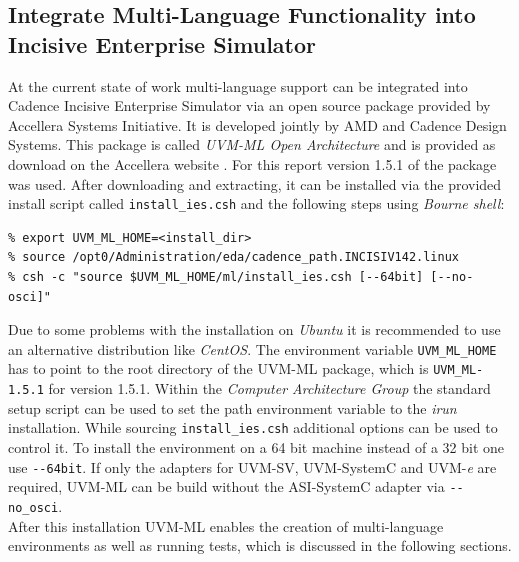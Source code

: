 \subsection{Integrate Multi-Language Functionality into Incisive Enterprise
Simulator}
At the current state of work multi-language support can be integrated into Cadence Incisive Enterprise Simulator via an open source package provided by Accellera Systems Initiative. It is developed jointly by AMD and Cadence Design
Systems. This package is called \emph{UVM-ML Open Architecture} and is provided as download on the Accellera website \cite{uvm_ml}.
For this report version 1.5.1 of the package was used. After downloading and extracting, it can be
installed via the provided install script called \lstinline$install_ies.csh$ and the following steps using \emph{Bourne shell}:

\medskip
{}
\begin{lstlisting}
% export UVM_ML_HOME=<install_dir>
% source /opt0/Administration/eda/cadence_path.INCISIV142.linux
% csh -c "source $UVM_ML_HOME/ml/install_ies.csh [--64bit] [--no-osci]"
\end{lstlisting} 
\medskip 

Due to some problems with the installation on \emph{Ubuntu} it is recommended to use an alternative distribution like
\emph{CentOS}. The environment variable \lstinline$UVM_ML_HOME$ has to point to the root directory of the UVM-ML
package, which is \lstinline$UVM_ML-1.5.1$ for version 1.5.1. Within the \emph{Computer Architecture Group} the standard setup script can be used
to set the path environment variable to the \emph{irun} installation. While sourcing
\lstinline$install_ies.csh$ additional options can be used to control it. To install the environment on a 64 bit machine
instead of a 32 bit one use \lstinline$--64bit$. If only the adapters for UVM-SV, UVM-SystemC and
UVM-\textit{e} are required, UVM-ML can be build without the ASI-SystemC adapter via \lstinline$--no_osci$.\\
After this installation UVM-ML enables the creation of multi-language environments as well as running tests, which is
discussed in the following sections.

